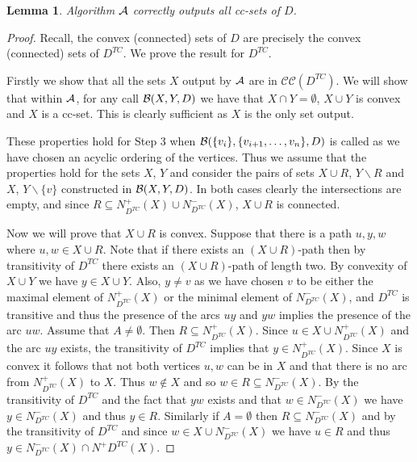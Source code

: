 \documentclass[11pt]{article}
\newcommand{\2}{\vspace{0.2 cm}}
\newtheorem{lemma}[theorem]{Lemma}
\begin{document}
\begin{lemma}\label{corlem}
Algorithm $\cal A$ correctly outputs all cc-sets of $D$.
\end{lemma}
\begin{proof}
Recall, the convex (connected) sets of $D$ are precisely the convex
(connected) sets of $D^{TC}$. We prove the result for $D^{TC}$.

Firstly we show that all the sets $X$ output by $\cal A$ are in
$\mathcal{CC}(D^{TC})$. We will show that within $\cal A$, for any call
${\cal B}(X,Y,D)$ we have that $X\cap Y=\emptyset$, $X\cup Y$ is
convex and $X$ is a cc-set. This is clearly sufficient as $X$ is the only set output.

These properties hold for Step 3 when ${\cal
B}(\{v_i\},\{v_{i+1},\ldots,v_n\},D)$ is called as we have chosen an acyclic
ordering of the vertices.  Thus we assume that the properties hold for the sets
$X$, $Y$ and consider the pairs of sets $X\cup R$, $Y\backslash R$ and $X$,
$Y\backslash \{v\}$ constructed in ${\cal B}(X,Y,D)$. In both cases
clearly the intersections are empty, and since $R\subseteq
N^+_{D^{TC}}(X)\cup N^-_{D^{TC}}(X)$, $X\cup R$ is connected.

Now we will prove that $X\cup R$ is convex. Suppose that there is a path $u,y,w$
where $u,w\in X\cup R$. Note that if there exists an $(X\cup R)$-path then by
transitivity of $D^{TC}$ there exists an $(X\cup R)$-path of length two. By
convexity of $X\cup Y$ we have $y\in X\cup Y$. Also, $y\neq v$ as we have chosen $v$
to be either the maximal element of $N^+_{D^{TC}}(X)$ or the minimal element of
$N^-_{D^{TC}}(X)$, and $D^{TC}$ is transitive and thus the presence of the arcs $uy$
and $yw$ implies the presence of the arc $uw.$ Assume that $A\neq \emptyset$. Then
$R\subseteq N^+_{D^{TC}}(X)$. Since $u \in X \cup N^+_{D^{TC}}(X)$ and the arc $uy$
exists, the transitivity of $D^{TC}$ implies that $y\in N^+_{D^{TC}}(X)$. Since $X$
is convex it follows that not both vertices  $u,w$ can be in $X$  and that there is
no arc from $N^+_{D^{TC}}(X)$ to $X$. Thus $w\not\in X$ and so 
$w\in R\subseteq N^-_{D^{TC}}(X)$. By the transitivity of $D^{TC}$ and the fact that
$yw$ exists and that $w\in N^-_{D^{TC}}(X)$ we have $y\in N^-_{D^{TC}}(X)$ and thus
$y\in R$. Similarly if  $A=\emptyset$ then $R \subseteq N^-_{D^{TC}}(X)$ and by the
transitivity of $D^{TC}$ and since $w\in X\cup  N^-_{D^{TC}}(X)$  we have  $u\in R$
and thus $y\in N^-_{D^{TC}}(X)\cap N^+{D^{TC}}(X)$. 







\end{proof}
\end{document}
